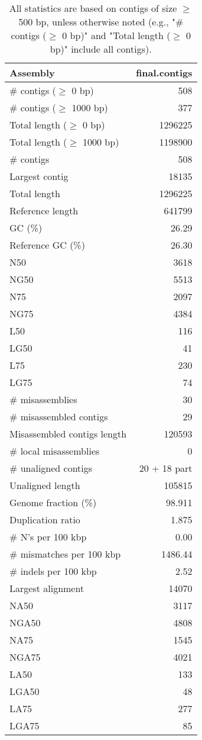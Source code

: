 \documentclass[12pt,a4paper]{article}
\begin{document}
\begin{table}[ht]
\begin{center}
\caption{All statistics are based on contigs of size $\geq$ 500 bp, unless otherwise noted (e.g., "\# contigs ($\geq$ 0 bp)" and "Total length ($\geq$ 0 bp)" include all contigs).}
\begin{tabular}{|l*{1}{|r}|}
\hline
Assembly & final.contigs \\ \hline
\# contigs ($\geq$ 0 bp) & 508 \\ \hline
\# contigs ($\geq$ 1000 bp) & 377 \\ \hline
Total length ($\geq$ 0 bp) & 1296225 \\ \hline
Total length ($\geq$ 1000 bp) & 1198900 \\ \hline
\# contigs & 508 \\ \hline
Largest contig & 18135 \\ \hline
Total length & 1296225 \\ \hline
Reference length & 641799 \\ \hline
GC (\%) & 26.29 \\ \hline
Reference GC (\%) & 26.30 \\ \hline
N50 & 3618 \\ \hline
NG50 & 5513 \\ \hline
N75 & 2097 \\ \hline
NG75 & 4384 \\ \hline
L50 & 116 \\ \hline
LG50 & 41 \\ \hline
L75 & 230 \\ \hline
LG75 & 74 \\ \hline
\# misassemblies & 30 \\ \hline
\# misassembled contigs & 29 \\ \hline
Misassembled contigs length & 120593 \\ \hline
\# local misassemblies & 0 \\ \hline
\# unaligned contigs & 20 + 18 part \\ \hline
Unaligned length & 105815 \\ \hline
Genome fraction (\%) & 98.911 \\ \hline
Duplication ratio & 1.875 \\ \hline
\# N's per 100 kbp & 0.00 \\ \hline
\# mismatches per 100 kbp & 1486.44 \\ \hline
\# indels per 100 kbp & 2.52 \\ \hline
Largest alignment & 14070 \\ \hline
NA50 & 3117 \\ \hline
NGA50 & 4808 \\ \hline
NA75 & 1545 \\ \hline
NGA75 & 4021 \\ \hline
LA50 & 133 \\ \hline
LGA50 & 48 \\ \hline
LA75 & 277 \\ \hline
LGA75 & 85 \\ \hline
\end{tabular}
\end{center}
\end{table}
\end{document}
